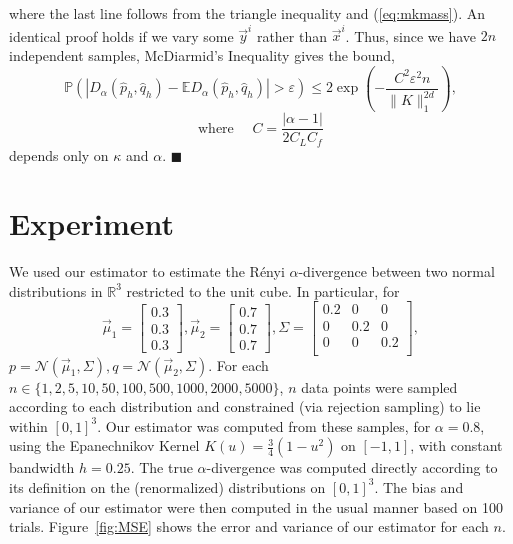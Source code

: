\documentclass{article}
\renewcommand{\qed}{\quad \ensuremath{\blacksquare}}    %
\newcommand{\R}{\mathbb{R}}                         %
\newcommand{\e}{\varepsilon}                        %
\newcommand{\E}{\mathbb{E}}                         %
\newcommand{\pr}{\mathbb{P}}                        %
\newcommand{\cpest}{\widehat{p}_h}                  %
\newcommand{\cqest}{\widehat{q}_h}                  %
\newcommand{\vx}{\vec{x}}                           %
\newcommand{\vy}{\vec{y}}                           %
\begin{document}
where the last line follows from the triangle inequality and (\ref{eq:mkmass}).
An identical proof holds if we vary some $\vy^i$ rather than $\vx^i$. Thus,
since we have $2n$ independent samples, McDiarmid's Inequality gives the bound,
\[ \pr \left( |D_\alpha(\cpest,\cqest) - \E D_\alpha(\cpest,\cqest)|
        > \e \right)
   \leq 2\exp \left(
            -\frac{C^2\e^2n}{\|K\|_1^{2d}}
        \right),
\]
\begin{equation}
\label{ineq:var_consts}
\mbox{where } \quad
  C = \frac{|\alpha - 1|}{2C_LC_f}
\end{equation}
depends only on $\kappa$ and $\alpha$. \qed

\section{Experiment} \label{sec:numerical}
We used our estimator to estimate the R\'enyi $\alpha$-divergence between two
normal distributions in $\R^3$ restricted to the unit cube. In particular, for
\[
\vec{\mu}_1 = \begin{bmatrix}
0.3 \\
0.3 \\
0.3
\end{bmatrix},
\vec{\mu}_2 = \begin{bmatrix}
0.7 \\
0.7 \\
0.7
\end{bmatrix},
\Sigma = \begin{bmatrix}
0.2 & 0   & 0   \\
0   & 0.2 & 0   \\
0   & 0   & 0.2 \\
\end{bmatrix},
\]
$p = \mathcal{N}(\vec{\mu}_1,\Sigma),q = \mathcal{N}(\vec{\mu}_2,\Sigma)$.
For each $n \in \{1,2,5,10,50,100,500,1000,2000,5000\}$, $n$ data points were
sampled according to each distribution and constrained (via rejection sampling)
to lie within $[0,1]^3$. Our estimator was computed from these samples, for
$\alpha = 0.8$, using the Epanechnikov Kernel $K(u) = \frac{3}{4} (1 - u^2)$
on $[-1,1]$, with constant bandwidth $h = 0.25$. The true $\alpha$-divergence
was computed directly according to its definition on the (renormalized)
distributions on $[0,1]^3$. The bias and variance of our estimator were then
computed in the usual manner based on 100 trials. Figure~\ref{fig:MSE} shows
the error and variance of our estimator for each $n$.
\end{document}
